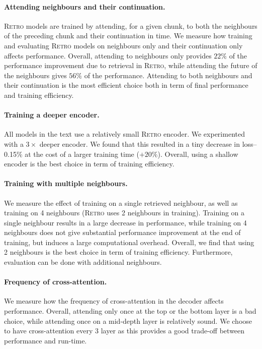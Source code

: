 \documentclass[11pt, a4paper, logo]{deepmind}
\newcommand{\retro}{\textsc{Retro}\xspace}
\begin{document}
\paragraph{Attending neighbours and their continuation.} \retro models are trained by attending, for a given chunk, to both the neighbours of the preceding chunk and their continuation in time. We measure how training and evaluating \retro models on neighbours only and their continuation only affects performance. Overall, attending to neighbours only provides $22\%$ of the performance improvement due to retrieval in \retro, while attending the future of the neighbours gives $56\%$ of the performance. Attending to both neighbours and their continuation is the most efficient choice both in term of final performance and training efficiency.\label{app:future_helps}

\paragraph{Training a deeper encoder.}
All models in the text use a relatively small \retro encoder.
We experimented with a $3\times$ deeper encoder. We found that this resulted in a tiny decrease in loss-- 0.15\% at the cost of a larger training time ($+20\%$). Overall, using a shallow encoder is the best choice in term of training efficiency.

\paragraph{Training with multiple neighbours.} We measure the effect of training on a single retrieved neighbour, as well as training on 4 neighbours (\retro uses 2 neighbours in training). Training on a single neighbour results in a large decrease in performance, while training on 4 neighbours does not give substantial performance improvement at the end of training, but induces a large computational overhead. Overall, we find that using 2 neighbours is the best choice in term of training efficiency. Furthermore, evaluation can be done with additional neighbours.


\paragraph{Frequency of cross-attention.}
We measure how the frequency of cross-attention in the decoder affects performance. Overall, attending only once at the top or the bottom layer is a bad choice, while attending once on a mid-depth layer is relatively sound. We choose to have cross-attention every 3 layer as this provides a good trade-off between performance and run-time.
\end{document}
